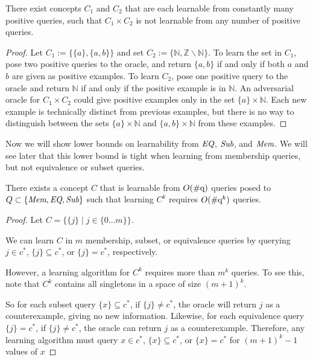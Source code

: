 \documentclass[11pt]{amsart}
\begin{document}
\begin{proposition}
There exist concepts $C_1$ and $C_2$ that are each learnable from constantly many positive queries, such that $C_1 \times C_2$ is not learnable from any number of positive queries. 
\end{proposition}
\begin{proof}
Let $C_1 := \{ \{a\}, \{a,b\} \}$ and set $C_2 := \{ \mathbb{N}, \mathbb{Z} \backslash \mathbb{N} \}$. 
To learn the set in $C_1$, pose two positive queries to the oracle, and return $\{a,b\}$ if and only if both $a$ and $b$ are given as positive examples. 
To learn $C_2$, pose one positive query to the oracle and return $\mathbb{N}$ if and only if the positive example is in $\mathbb{N}$. 
An adversarial oracle for $C_1 \times C_2$ could give positive examples only in the set $\{a\} \times \mathbb{N}$. 
Each new example is technically distinct from previous examples, but there is no way to distinguish between the sets $\{a\}\times \mathbb{N}$ and $\{a,b\} \times \mathbb{N}$ from these examples. 
\end{proof}

Now we will show lower bounds on learnability from $\emph{EQ}$, $\emph{Sub}$, and $\emph{Mem}$. 
We will see later that this lower bound is tight when learning from membership queries, but not equivalence or subset queries.


\begin{proposition}
There exists a concept $C$ that is learnable from $O(\genC)$ queries posed to $Q \subset \{ \emph{Mem}, \emph{EQ}, \emph{Sub} \}$ such that learning $C^k$ requires $O(\genC^k)$ queries.   
\end{proposition}
\begin{proof}
Let $C = \{ \{j\} \mid j \in \{0 \dots m\} \}$. 

We can learn $C$ in $m$ membership, subset, or equivalence queries by querying $j \in c^*$, $\{ j \} \subseteq c^*$, or $\{j\} = c^*$, respectively. 

However, a learning algorithm for $C^k$ requires more than $m^k$ queries. 
To see this, note that  $C^k$ contains all singletons in a space of size $(m+1)^k$. 

So for each subset query $\{x\} \subseteq c^*$, if $\{j\} \ne c^*$, the oracle will return $j$ as a counterexample, giving no new information.  
Likewise, for each equivalence query $\{j\} = c^*$, if $\{j\} \ne c^*$, the oracle can return $j$ as a counterexample.
Therefore, any learning algorithm must query $x \in c^*$, $\{ x \} \subseteq c^*$, or $\{x\} = c^*$ for $(m+1)^k - 1$ values of $x$
\end{proof}
\end{document}
